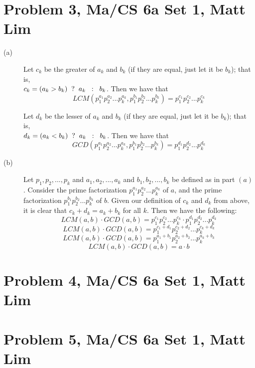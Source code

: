 \documentclass{article}
\begin{document}
\section*{Problem 3, Ma/CS 6a Set 1, Matt Lim}
\begin{description}
    \item[(a)]
        Let $c_k$ be the greater of $a_k$ and $b_k$ (if they are equal,
        just let it be $b_k$); that is, \\
        $c_k = (a_k > b_k) \hspace{2mm} ? \hspace{2mm} a_k \hspace{2mm} :
        \hspace{2mm} b_k$. Then we have that
        \[ LCM(p_1^{a_1}p_2^{a_2}...p_k^{a_k}, p_1^{b_1}p_2^{b_2}...
        p_k^{b_k}) = p_1^{c_1}p_2^{c_2}...p_k^{c_k} \]

        Let $d_k$ be the lesser of $a_k$ and $b_k$ (if they are equal,
        just let it be $b_k$); that is, \\
        $d_k = (a_k < b_k) \hspace{2mm} ? \hspace{2mm} a_k \hspace{2mm} :
        \hspace{2mm} b_k$. Then we have that
        \[ GCD(p_1^{a_1}p_2^{a_2}...p_k^{a_k}, p_1^{b_1}p_2^{b_2}...
        p_k^{b_k}) = p_1^{d_1}p_2^{d_2}...p_k^{d_k} \]
    \item[(b)]
        Let $p_1,p_2,...,p_k$ and $a_1,a_2,...,a_k$ and $b_1,b_2,...,b_k$ be defined
        as in part $(a)$.
        Consider the prime factorization $p_1^{a_1}p_2^{a_2}...p_k^{a_k}$
        of $a$, and the prime factorization $p_1^{b_1}p_2^{b_2}...
        p_k^{b_k}$ of $b$.
        Given our definition of $c_k$ and $d_k$ from above, it is clear that
        $c_k + d_k = a_k + b_k$ for all $k$. Then we have the following:
        \[ LCM(a,b) \cdot GCD(a,b) = p_1^{c_1}p_2^{c_2}...p_k^{c_k} \cdot
        p_1^{d_1}p_2^{d_2}...p_k^{d_k} \]
        \[ LCM(a,b) \cdot GCD(a,b) = p_1^{c_1 + d_1}p_2^{c_2 + d_2}...p_k^{c_k +
        d_k} \]
        \[ LCM(a,b) \cdot GCD(a,b) = p_1^{a_1 + b_1}p_2^{a_2 + b_2}...p_k^{a_k +
        b_k} \]
        \[ LCM(a,b) \cdot GCD(a,b) = a \cdot b \]
\end{description}
\newpage
\section*{Problem 4, Ma/CS 6a Set 1, Matt Lim}
\newpage
\section*{Problem 5, Ma/CS 6a Set 1, Matt Lim}
\newpage
\end{document}
